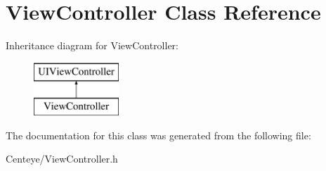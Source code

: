 \hypertarget{interface_view_controller}{\section{View\+Controller Class Reference}
\label{interface_view_controller}
}
Inheritance diagram for View\+Controller\+:\begin{figure}[H]
\begin{center}
\leavevmode
\includegraphics[height=2.000000cm]{interface_view_controller}
\end{center}
\end{figure}


The documentation for this class was generated from the following file\+:\begin{DoxyCompactItemize}
\item 
Centeye/View\+Controller.\+h\end{DoxyCompactItemize}
